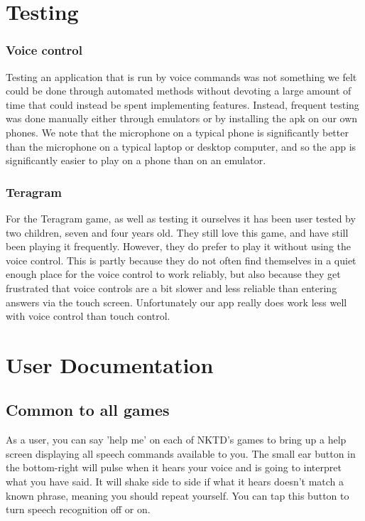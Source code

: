 \documentclass[11pt, oneside]{article}
\begin{document}
\pagebreak

\section{Testing}

\subsubsection*{Voice control}

Testing an application that is run by voice commands was not something
we felt could be done through automated methods without devoting a
large amount of time that could instead be spent implementing
features. Instead, frequent testing was done manually either through
emulators or by installing the apk on our own phones. We note that the
microphone on a typical phone is significantly better than the
microphone on a typical laptop or desktop computer, and so the app is
significantly easier to play on a phone than on an emulator.

\subsubsection*{Teragram}

For the Teragram game, as well as testing it ourselves it has been
user tested by two children, seven and four years old. They still love
this game, and have still been playing it frequently.  However, they
do prefer to play it without using the voice control. This is partly
because they do not often find themselves in a quiet enough place for
the voice control to work reliably, but also because they get
frustrated that voice controls are a bit slower and less reliable than
entering answers via the touch screen. Unfortunately our app really
does work less well with voice control than touch control.

\pagebreak

\section{User Documentation}

\subsection{Common to all games}
As a user, you can say 'help me' on each of NKTD's games to bring up a
help screen displaying all speech commands available to you.
The small ear button in the bottom-right will pulse when it hears your voice 
and is going to interpret what you have said. It will shake side to side if
what it hears doesn't match a known phrase, meaning you should repeat
yourself. You can tap this button to turn speech recognition off or on.
\end{document}
